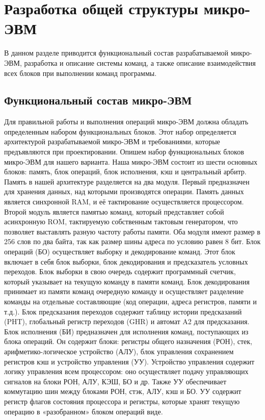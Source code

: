 \section{Разработка общей структуры микро-ЭВМ}
\label{sec:domain}

В данном разделе приводится функциональный состав разрабатываемой микро-ЭВМ, разработка и описание системы команд, а также описание взаимодействия всех блоков при выполнении команд программы.
\subsection{Функциональный состав микро-ЭВМ}
\label{sub:domain:bayes_net}
Для правильной работы и выполнения операций микро-ЭВМ должна обладать определенным набором функциональных блоков. Этот набор определяется архитектурой разрабатываемой микро-ЭВМ и требованиями, которые предъявляются при проектировании. Опишем набор функциональных блоков микро-ЭВМ для нашего варианта.
Наша микро-ЭВМ состоит из шести основных блоков: память, блок операций, блок исполнения, кэш и центральный арбитр.
Память в нашей архитектуре разделяется на два модуля. Первый предназначен для хранения данных, над которыми производятся операции. Память данных является синхронной RAM, и её тактирование осуществляется процессором. Второй модуль является памятью команд, который представляет собой асинхронную ROM, тактируемую собственным тактовым генератором, что позволяет выставлять разную частоту работы памяти. Оба модуля имеют размер в 256 слов по два байта, так как размер шины адреса по условию равен 8 бит.
Блок операций (БО) осуществляет выборку и декодирование команд. Этот блок включает в себя блок выборки, блок декодирования и предсказатель условных переходов. Блок выборки в свою очередь содержит программный счетчик, который указывает на текущую команду в памяти команд. Блок декодирования принимает из памяти команд очередную команду и осуществляет разделение команды на отдельные составляющие (код операции, адреса регистров, памяти и т.д.). Блок предсказания переходов содержит таблицу истории предсказаний (PHT), глобальный регистр переходов (GHR) и автомат A2 для предсказания.
Блок исполнения (БИ) предназначен для исполнения команд, поступающих из блока операций. Он содержит блоки: регистры общего назначения (РОН), стек, арифметико-логическое устройство (АЛУ), блок управления сохранением регистров кэш и устройство управления (УУ). Устройство управления содержит логику управления всем процессором: оно осуществляет подачу управляющих сигналов на блоки РОН, АЛУ, КЭШ, БО и др. Также УУ обеспечивает коммутацию шин между блоками РОН, стэк, АЛУ, кэш и БО. УУ содержит регистр флагов состояния процессора и регистры, которые хранят текущую операцию в «разобранном» блоком операций виде.
